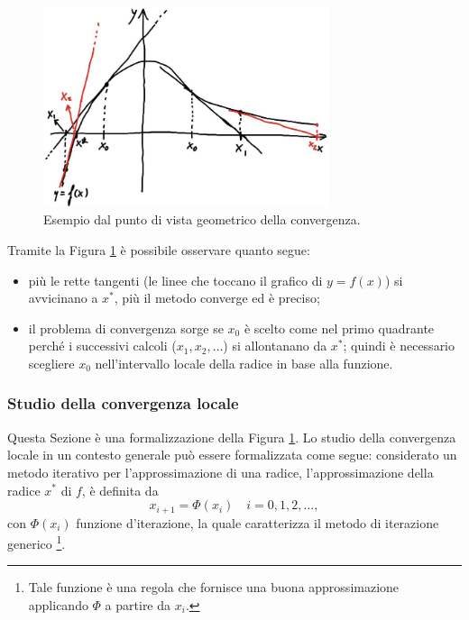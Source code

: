\begin{figure}
	\centering
	\includegraphics[width=0.75\textwidth]{immagini/EsemGeoConv.png}
	\caption{\label{fig:EsemGeoConv}Esempio dal punto di vista geometrico della convergenza.}
\end{figure}

Tramite la Figura \ref{fig:EsemGeoConv} è possibile osservare quanto segue: \begin{itemize}
	\item più le rette tangenti (le linee che toccano il grafico di $y=f(x)$) si avvicinano a $x^*$, più  il metodo converge ed è preciso;
	\item il problema di convergenza sorge se $x_0$ è scelto come nel primo quadrante perché i successivi calcoli ($x_1, x_2, \hdots$) si allontanano da $x^*$; quindi è necessario scegliere $x_0$ nell'intervallo locale della radice in base alla funzione.
\end{itemize}

\subsubsection{Studio della convergenza locale}
Questa Sezione è una formalizzazione della Figura \ref{fig:EsemGeoConv}.
Lo studio della convergenza locale in un contesto generale può essere formalizzata come segue: considerato un metodo iterativo per l'approssimazione di una radice, l'approssimazione della radice $x^*$ di $f$, è definita da
\begin{equation}\label{eq:funzIteraz}
	x_{i+1}=\Phi (x_i)\quad i=0,1,2,\hdots,
\end{equation}
con $\Phi (x_i)$ funzione d'iterazione, la quale caratterizza il metodo di iterazione generico \footnote{Tale funzione è una regola che fornisce una buona approssimazione applicando $\Phi$ a partire da $x_i$.}.

